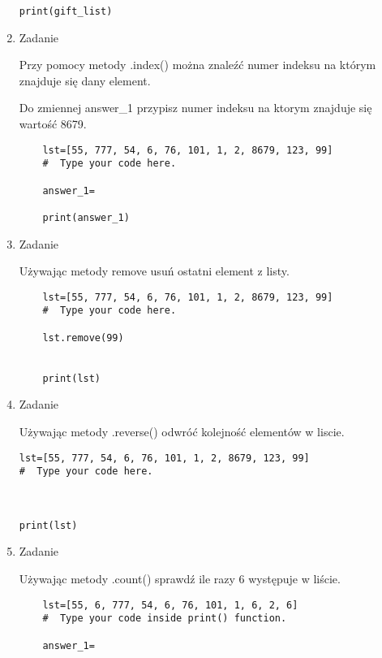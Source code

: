 \documentclass[11pt]{article}
\begin{document}
\begin{enumerate}
\begin{lstlisting}
print(gift_list)
\end{lstlisting}

	\item
\begin{Large}
	Zadanie
\end{Large}
\par
Przy pomocy metody .index() można znaleźć numer indeksu na którym znajduje się dany element.
\par
Do zmiennej answer\_1 przypisz numer indeksu na ktorym znajduje się wartość 8679.
\begin{lstlisting}	
	lst=[55, 777, 54, 6, 76, 101, 1, 2, 8679, 123, 99]
	#  Type your code here.
	
	answer_1=
	
	print(answer_1)
\end{lstlisting}

	\item
\begin{Large}
	Zadanie
\end{Large}
\par
Używając metody remove usuń ostatni element z listy.
\begin{lstlisting}	
	lst=[55, 777, 54, 6, 76, 101, 1, 2, 8679, 123, 99]
	#  Type your code here.
	
	lst.remove(99)
	
	
	print(lst)
\end{lstlisting}

	\item
\begin{Large}
	Zadanie
\end{Large}
\par
Używając metody .reverse() odwróć kolejność elementów w liscie.
\begin{lstlisting}	
lst=[55, 777, 54, 6, 76, 101, 1, 2, 8679, 123, 99]
#  Type your code here.



print(lst)
\end{lstlisting}

	\item
\begin{Large}
	Zadanie
\end{Large}
\par
Używając metody .count() sprawdź ile razy 6 występuje w liście.
\begin{lstlisting}	
	lst=[55, 6, 777, 54, 6, 76, 101, 1, 6, 2, 6]
	#  Type your code inside print() function.
	
	answer_1=
	

\end{lstlisting}
\end{enumerate}
\end{document}
